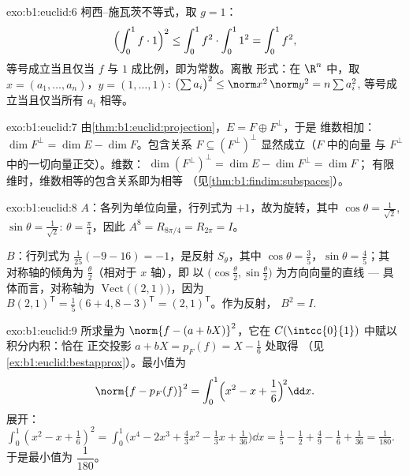\begin{solution}{exo:b1:euclid:6}
柯西–施瓦茨不等式，取 $g = 1$：
\[
\Bigl(\int_0^1 f \cdot 1\Bigr)^2 \leq \int_0^1 f^2 \cdot \int_0^1
1^2 = \int_0^1 f^2 ,
\]
等号成立当且仅当 $f$ 与 $1$ 成比例，即为常数。离散
形式：在 $\R^n$ 中，取 $x = (a_1, \dots, a_n)$，$y = (1, \dots,
1)$:
$\bigl(\sum a_i\bigr)^2 \leq \norm x^2\, \norm y^2 = n \sum a_i^2$,
等号成立当且仅当所有 $a_i$ 相等。
\end{solution}

\begin{solution}{exo:b1:euclid:7}
由\cref{thm:b1:euclid:projection}，$E = F \oplus F^\perp$，于是
维数相加：$\dim F^\perp = \dim E - \dim F$。包含关系 $F
\subseteq (F^\perp)^\perp$ 显然成立（$F$ 中的向量
与 $F^\perp$ 中的一切向量正交）。维数：
$\dim(F^\perp)^\perp = \dim E - \dim F^\perp = \dim F$；
有限维时，维数相等的包含关系即为相等
（见\cref{thm:b1:findim:subspaces}）。
\end{solution}

\begin{solution}{exo:b1:euclid:8}
$A$：各列为单位向量，行列式为 $+1$，故为旋转，其中 $\cos\theta =
\frac{1}{\sqrt2}$, $\sin\theta = \frac{1}{\sqrt2}$: $\theta =
\frac\pi4$，因此 $A^8 = R_{8\pi/4} = R_{2\pi} = I$。

$B$：行列式为 $\frac{1}{25}(-9 - 16) = -1$，是反射
$S_\theta$，其中 $\cos\theta = \frac35$，$\sin\theta = \frac45$；其
对称轴的倾角为 $\frac\theta2$（相对于 $x$ 轴），即
以 $\bigl(\cos\frac\theta2, \sin\frac\theta2\bigr)$ 为方向向量的直线
--- 具体而言，对称轴为
$\operatorname{Vect}\bigl((2, 1)\bigr)$，因为 $B(2,1)^{\mathsf T} =
\frac15(6+4, 8-3)^{\mathsf T} = (2,1)^{\mathsf T}$。作为反射，
$B^2 = I$.
\end{solution}

\begin{solution}{exo:b1:euclid:9}
所求量为 $\norm{f - (a + bX)}^2$，它在 $C(\intcc{0}{1})$ 中赋以
积分内积：恰在
正交投影 $a + bX = p_F(f) = X - \frac16$ 处取得
（见\cref{ex:b1:euclid:bestapprox}）。最小值为
\[
\norm{f - p_F(f)}^2 = \int_0^1 \Bigl(x^2 - x + \frac16\Bigr)^{\!2}
\dd x .
\]
展开：$\int_0^1 (x^2 - x + \frac16)^2 = \int_0^1 \bigl(x^4 - 2x^3
+ \frac{4}{3}x^2 - \frac13 x + \frac{1}{36}\bigr)\dd x = \frac15 -
\frac12 + \frac49 - \frac16 + \frac{1}{36} = \frac{1}{180}$.
于是最小值为 $\dfrac{1}{180}$。
\end{solution}

